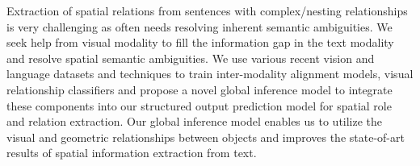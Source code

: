 Extraction of spatial relations from sentences with complex/nesting relationships is very challenging as often needs resolving inherent semantic ambiguities. We seek help from visual modality to fill the information gap in the text modality and resolve spatial semantic ambiguities. We use various recent vision and language datasets and techniques to train inter-modality alignment models, visual relationship classifiers and propose a novel global inference model to integrate these components into our structured output prediction model for spatial role and relation extraction. Our global inference model enables us to utilize the visual and geometric relationships between objects and improves the state-of-art results of spatial information extraction from text.
